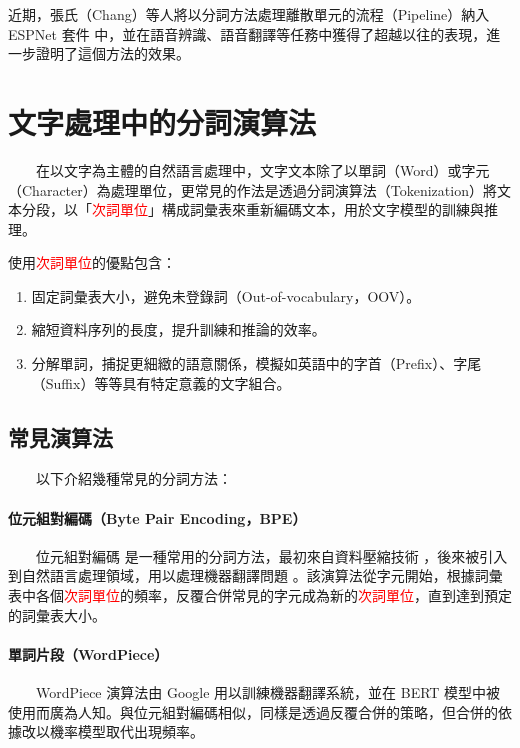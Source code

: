         近期，張氏（Chang）等人\cite{chang_exploring_2024}將以分詞方法處理離散單元的流程（Pipeline）納入 ESPNet 套件 \cite{watanabe2018espnet} 中，並在語音辨識、語音翻譯等任務中獲得了超越以往的表現，進一步證明了這個方法的效果。

\section{文字處理中的分詞演算法}

　　在以文字為主體的自然語言處理中，文字文本除了以單詞（Word）或字元（Character）為處理單位，更常見的作法是透過分詞演算法（Tokenization）將文本分段，以「\textcolor{red}{次詞單位}」構成詞彙表來重新編碼文本，用於文字模型的訓練與推理。

        使用\textcolor{red}{次詞單位}的優點包含：
            \begin{enumerate}
                \item 固定詞彙表大小，避免未登錄詞（Out-of-vocabulary，OOV）。
                \item 縮短資料序列的長度，提升訓練和推論的效率。
                \item 分解單詞，捕捉更細緻的語意關係，模擬如英語中的字首（Prefix）、字尾（Suffix）等等具有特定意義的文字組合。
            \end{enumerate}

\subsection{常見演算法}

　　以下介紹幾種常見的分詞方法：

\paragraph{位元組對編碼（Byte Pair Encoding，BPE）} \hfill \break
%
　　位元組對編碼 \cite{10.5555/177910.177914, sennrich_neural_2016} 是一種常用的分詞方法，最初來自資料壓縮技術 \cite{10.5555/177910.177914}，後來被引入到自然語言處理領域，用以處理機器翻譯問題 \cite{sennrich_neural_2016} 。該演算法從字元開始，根據詞彙表中各個\textcolor{red}{次詞單位}的頻率，反覆合併常見的字元成為新的\textcolor{red}{次詞單位}，直到達到預定的詞彙表大小。

\paragraph{單詞片段（WordPiece）} \hfill \break
%
　　WordPiece \cite{wu2016google} 演算法由 Google 用以訓練機器翻譯系統，並在 BERT \cite{devlin_bert_2019} 模型中被使用而廣為人知。與位元組對編碼相似，同樣是透過反覆合併的策略，但合併的依據改以機率模型取代出現頻率。


